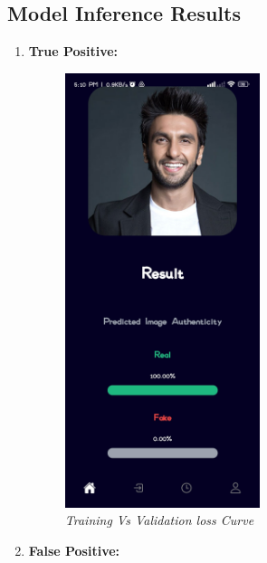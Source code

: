 \subsection{Model Inference Results }
\begin{enumerate}
    \item \textbf{True Positive:}
         
          \begin{figure}[ht]
              \centering
              \includegraphics[height =5in  ]{img/ranveerResult.jpg}
              \caption{\textit{Training Vs Validation loss Curve}}
          \end{figure}

          \newpage
    \item \textbf{False Positive:}
       

\end{enumerate}
